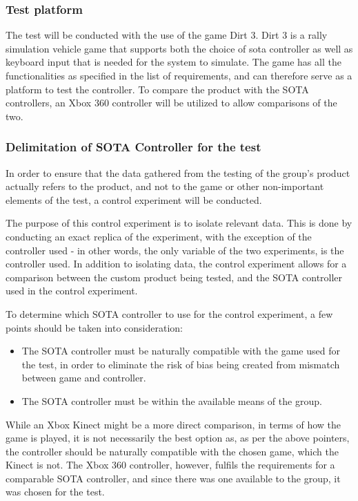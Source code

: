 \subsubsection{Test platform}
The test will be conducted with the use of the game Dirt 3. 
Dirt 3 is a rally simulation vehicle game that supports both the choice of sota controller as well as keyboard input that is needed for the system to simulate.  
The game has all the functionalities as specified in the list of requirements, and can therefore serve as a platform to test the controller.
To compare the product with the SOTA controllers, an Xbox 360 controller will be utilized to allow comparisons of the two.


\subsubsection{Delimitation of SOTA Controller for the test}
In order to ensure that the data gathered from the testing of the group's product actually refers to the product, and not to the game or other non-important elements of the test, a control experiment will be conducted.

The purpose of this control experiment is to isolate relevant data. 
This is done by conducting an exact replica of the experiment, with the exception of the controller used - in other words, the only variable of the two experiments, is the controller used. 
In addition to isolating data, the control experiment allows for a comparison between the custom product being tested, and the SOTA controller used in the control experiment.
\bigskip

To determine which SOTA controller to use for the control experiment, a few points should be taken into consideration:
\begin{itemize}
\item The SOTA controller must be naturally compatible with the game used for the test, in order to eliminate the risk of bias being created from mismatch between game and controller.

\item The SOTA controller must be within the available means of the group.
\end{itemize}

While an Xbox Kinect might be a more direct comparison, in terms of how the game is played, it is not necessarily the best option as, as per the above pointers, the controller should be naturally compatible with the chosen game, which the Kinect is not. 
The Xbox 360 controller, however, fulfils the requirements for a comparable SOTA controller, and since there was one available to the group, it was chosen for the test.


